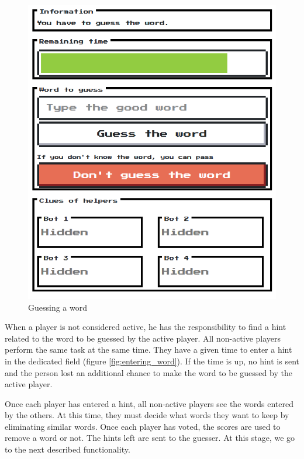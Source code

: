 \documentclass{tnreport}
\begin{document}
\begin{figure}
	\centering
	\vspace*{-0.7cm}
	\includegraphics[scale=0.4]{figures/guessing_word}
	\caption{Guessing a word}
	\label{fig:guessing_word}
\end{figure} 

When a player is not considered active, he has the responsibility to find a hint related to the word to be guessed by the active player. All non-active players perform the same task at the same time. They have a given time to enter a hint in the dedicated field (figure \ref{fig:entering_word}). If the time is up, no hint is sent and the person lost an additional chance to make the word to be guessed by the active player. 

Once each player has entered a hint, all non-active players see the words entered by the others. At this time, they must decide what words they want to keep by eliminating similar words. Once each player has voted, the scores are used to remove a word or not. The hints left are sent to the guesser. At this stage, we go to the next described functionality. 
\end{document}
